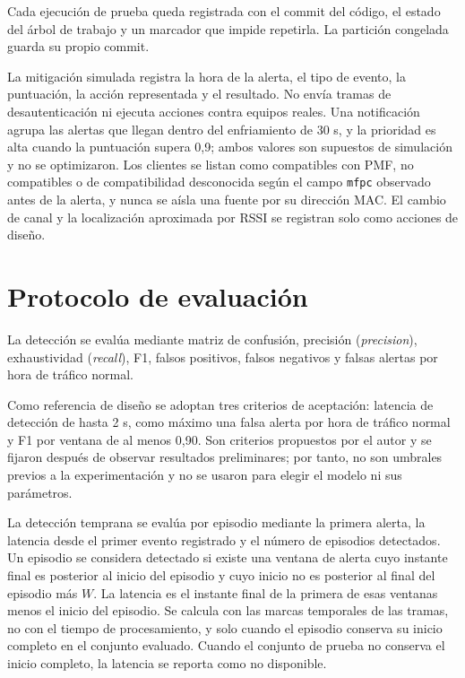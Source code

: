 \documentclass[journal]{IEEEtran}
\begin{document}
Cada ejecución de prueba queda registrada con el commit del código, el estado del árbol de trabajo y un marcador que impide repetirla. La partición congelada guarda su propio commit.

La mitigación simulada registra la hora de la alerta, el tipo de evento, la puntuación, la acción representada y el resultado. No envía tramas de desautenticación ni ejecuta acciones contra equipos reales. Una notificación agrupa las alertas que llegan dentro del enfriamiento de 30 s, y la prioridad es alta cuando la puntuación supera 0,9; ambos valores son supuestos de simulación y no se optimizaron. Los clientes se listan como compatibles con PMF, no compatibles o de compatibilidad desconocida según el campo \texttt{mfpc} observado antes de la alerta, y nunca se aísla una fuente por su dirección MAC. El cambio de canal y la localización aproximada por RSSI se registran solo como acciones de diseño.

\section{Protocolo de evaluación}

La detección se evalúa mediante matriz de confusión, precisión (\textit{precision}), exhaustividad (\textit{recall}), F1, falsos positivos, falsos negativos y falsas alertas por hora de tráfico normal.

Como referencia de diseño se adoptan tres criterios de aceptación: latencia de detección de hasta 2 s, como máximo una falsa alerta por hora de tráfico normal y F1 por ventana de al menos 0,90. Son criterios propuestos por el autor y se fijaron después de observar resultados preliminares; por tanto, no son umbrales previos a la experimentación y no se usaron para elegir el modelo ni sus parámetros.

La detección temprana se evalúa por episodio mediante la primera alerta, la latencia desde el primer evento registrado y el número de episodios detectados. Un episodio se considera detectado si existe una ventana de alerta cuyo instante final es posterior al inicio del episodio y cuyo inicio no es posterior al final del episodio más $W$. La latencia es el instante final de la primera de esas ventanas menos el inicio del episodio. Se calcula con las marcas temporales de las tramas, no con el tiempo de procesamiento, y solo cuando el episodio conserva su inicio completo en el conjunto evaluado. Cuando el conjunto de prueba no conserva el inicio completo, la latencia se reporta como no disponible.
\end{document}
